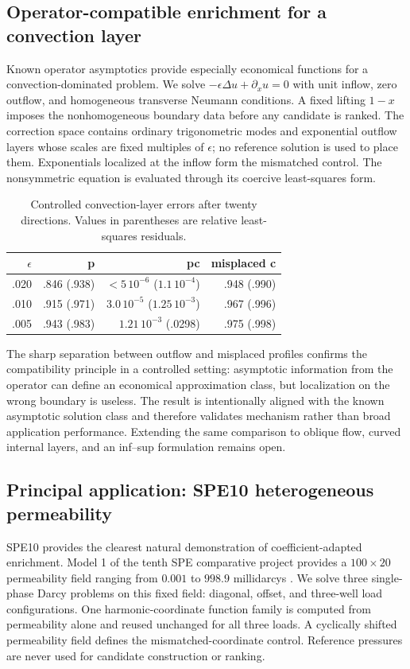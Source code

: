 \documentclass[11pt]{article}
\numberwithin{algorithm}{section}
\theoremstyle{definition}\newtheorem{definition}[theorem]{Definition}
\theoremstyle{remark}\newtheorem{remark}[theorem]{Remark}
\begin{document}
\subsection{Operator-compatible enrichment for a convection layer}
Known operator asymptotics provide especially economical functions for a
convection-dominated problem.  We solve
$-\epsilon\Delta u+\partial_xu=0$ with unit inflow, zero outflow, and
homogeneous transverse Neumann conditions.  A fixed lifting $1-x$ imposes the
nonhomogeneous boundary data before any candidate is ranked.  The correction
space contains ordinary trigonometric modes and exponential outflow layers
whose scales are fixed multiples of $\epsilon$; no reference solution is used
to place them.  Exponentials localized at the inflow form the mismatched
control.  The nonsymmetric equation is evaluated through its coercive
least-squares form.

\begin{table}[h]
\centering
\caption{Controlled convection-layer errors after twenty directions.  Values
in parentheses are relative least-squares residuals.}
\begin{tabular}{rrrr}
\toprule
$\epsilon$ & p & pc & misplaced c\\
\midrule
.020 & .846 (.938) & $<5\,10^{-6}$ ($1.1\,10^{-4}$) & .948 (.990)\\
.010 & .915 (.971) & $3.0\,10^{-5}$ ($1.25\,10^{-3}$) & .967 (.996)\\
.005 & .943 (.983) & $1.21\,10^{-3}$ (.0298) & .975 (.998)\\
\bottomrule
\end{tabular}
\label{tab:convection-layer}
\end{table}

The sharp separation between outflow and misplaced profiles confirms the
compatibility principle in a controlled setting: asymptotic information from
the operator can define an economical approximation class, but localization
on the wrong boundary is useless.  The result is intentionally
aligned with the known asymptotic solution class and therefore validates mechanism rather than broad
application performance.  Extending the same comparison to oblique flow,
curved internal layers, and an inf--sup formulation remains open.

\endsecondarynumericsA
\secondarynumericsE

\subsection{Principal application: SPE10 heterogeneous permeability}
SPE10 provides the clearest natural demonstration of coefficient-adapted
enrichment.  Model 1 of the tenth SPE comparative project provides a
$100\times20$ permeability field ranging from $0.001$ to $998.9$ millidarcys
\cite{christieblunt2001}.  We solve three single-phase Darcy problems on this
fixed field: diagonal, offset, and three-well load configurations.  One
harmonic-coordinate function family is computed from permeability alone and reused
unchanged for all three loads.  A cyclically shifted permeability field defines
the mismatched-coordinate control.  Reference pressures are never used for
candidate construction or ranking.
\end{document}
